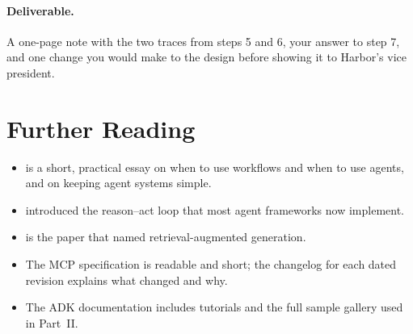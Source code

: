 \paragraph{Deliverable.} A one-page note with the two traces from steps 5 and 6, your answer to step 7, and one change you would make to the design before showing it to Harbor's vice president.

\section*{Further Reading}

\begin{itemize}[itemsep=2pt]
  \item \citet{anthropic2024effective} is a short, practical essay on when to use workflows and when to use agents, and on keeping agent systems simple.
  \item \citet{yao2023react} introduced the reason--act loop that most agent frameworks now implement.
  \item \citet{lewis2020rag} is the paper that named retrieval-augmented generation.
  \item The MCP specification \citep{mcp2026spec} is readable and short; the changelog for each dated revision explains what changed and why.
  \item The ADK documentation \citep{adkdocs} includes tutorials and the full sample gallery used in Part~II.
\end{itemize}
